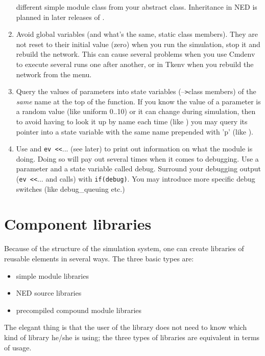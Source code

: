 \begin{enumerate}
{    different simple module class from your
    abstract class. Inheritance in NED is
    planned in later releases of {\opp}.}
\item{Avoid global variables (and what's the
    same, static class members).  They are not reset to their initial
    value (zero) when you run the simulation, stop it and rebuild the
    network. This can cause several problems when you use Cmdenv to
    execute several runs one after another, or in Tkenv when you
    rebuild the network from the menu.}
\item{Query the values of parameters into state variables
    (--\texttt{>}class members) of the \textit{same} name at the top
    of the  function.  If you know the value of a
    parameter is a random value (like uniform 0..10) or it can change
    during simulation, then to avoid having to look it up by name each
    time (like ) you may query its pointer into a
     state variable with the same name prepended with
    'p' (like ).}
  \item{Use  and \texttt{ev <}\texttt{<}... (see
    later) to print out information on what the module is doing. Doing
    so will pay out several times when it comes to debugging. Use a
    parameter and a state variable called debug. Surround your
    debugging output (\texttt{ev <}\texttt{<}... and
     calls) with \texttt{if(debug)}.  You may
    introduce more specific debug switches (like debug\_queuing etc.)}
\end{enumerate}




\section{Component libraries}

Because of the structure of the simulation system, one can create
libraries of reusable elements in several ways. The three basic
types are:
\begin{itemize}
\item{simple module libraries}
\item{NED source libraries}
\item{precompiled compound module libraries}
\end{itemize}

The elegant thing is that the user of the library does not need
to know which kind of library he/she is using; the three types
of libraries are equivalent in terms of usage.





